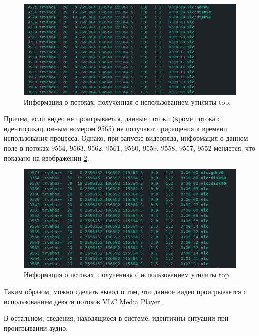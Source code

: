 \begin{figure}[H]
	\centering
	\includegraphics[scale=0.8]{img/vlcThreads.png}
	\caption{Информация о потоках, полученная с использованием утилиты top. }
	\label{fig:vlcThreads}
\end{figure}

Причем, если видео не проигрывается, данные потоки (кроме потока с идентификационным номером 9565) не получают приращения к времени использования процесса. Однако, при запуске видеоряда, информация о данном поле в потоках 9564, 9563, 9562, 9561, 9560, 9559, 9558, 9557, 9552 меняется, что показано на изображении \ref{fig:vlcThreadsAfter}.

\begin{figure}[H]
	\centering
	\includegraphics[scale=0.8]{img/vlcThreadsAfter.png}
	\caption{Информация о потоках, полученная с использованием утилиты top. }
	\label{fig:vlcThreadsAfter}
\end{figure}

Таким образом, можно сделать вывод о том, что данное видео проигрывается с использованием девяти потоков VLC Media Player.

В остальном, сведения, находящиеся в системе, идентичны ситуации при проигрывании аудио.

